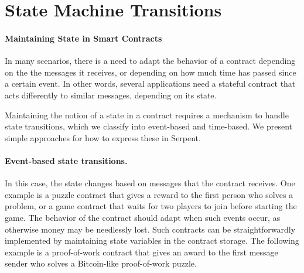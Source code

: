 \documentclass[10pt,twocolumn,letterpaper]{article}
\begin{document}
\section{State Machine Transitions}

\paragraph{Maintaining State in Smart Contracts}

In many scenarios, there is a need to adapt the behavior of a contract depending on the the messages it receives, or depending on how much time has passed since a certain event. In other words, several applications need a stateful contract that acts differently to similar messages, depending on its state.

Maintaining the notion of a state in a contract requires a mechanism to handle state transitions, which we classify into event-based and time-based. We present simple approaches for how to express these in Serpent.

\paragraph{Event-based state transitions.}

In this case, the state changes based on messages that the contract receives. One example is a puzzle contract that gives a reward to the first person who solves a problem, or a game contract that waits for two players to join before starting the game. The behavior of the contract should adapt when such events occur, as otherwise money may be needlessly lost. Such contracts can be straightforwardly implemented by maintaining state variables in the contract storage. The following example is a proof-of-work contract that gives an award to the first message sender who solves a Bitcoin-like proof-of-work puzzle.

\end{document}
